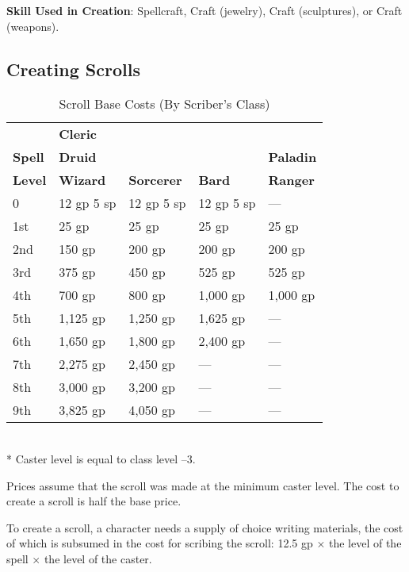 \textbf{Skill Used in Creation}: Spellcraft, Craft (jewelry), Craft (sculptures), or Craft (weapons).
				
\subsection{Creating Scrolls}


\begin{table}[]
\sffamily
\caption{Scroll Base Costs (By Scriber's Class)}
\begin{tabular}{lllll}
               & \textbf{Cleric} & \\
\textbf{Spell} & \textbf{Druid}  &                   &               & \textbf{Paladin} \\
\textbf{Level} & \textbf{Wizard} & \textbf{Sorcerer} & \textbf{Bard} & \textbf{Ranger} \\
0           & 12 gp 5 sp            & 12 gp 5 sp & 12 gp 5 sp & ---                \\
1st         & 25 gp                 & 25 gp      & 25 gp      & 25 gp            \\
2nd         & 150 gp                & 200 gp     & 200 gp     & 200 gp           \\
3rd         & 375 gp                & 450 gp     & 525 gp     & 525 gp           \\
4th         & 700 gp                & 800 gp     & 1,000 gp   & 1,000 gp         \\
5th         & 1,125 gp              & 1,250 gp   & 1,625 gp   & ---                \\
6th         & 1,650 gp              & 1,800 gp   & 2,400 gp   & ---                \\
7th         & 2,275 gp              & 2,450 gp   & ---          & ---                \\
8th         & 3,000 gp              & 3,200 gp   & ---          & ---                \\
9th         & 3,825 gp              & 4,050 gp   & ---          & ---               
\end{tabular}\\
* Caster level is equal to class level --3.
\end{table}
Prices assume that the scroll was made at the minimum caster level. The cost to create a scroll is half the base price.
				
To create a scroll, a character needs a supply of choice writing materials, the cost of which is subsumed in the cost for scribing the scroll: 12.5 gp \mbox{$\times$} the level of the spell \mbox{$\times$} the level of the caster.
				
